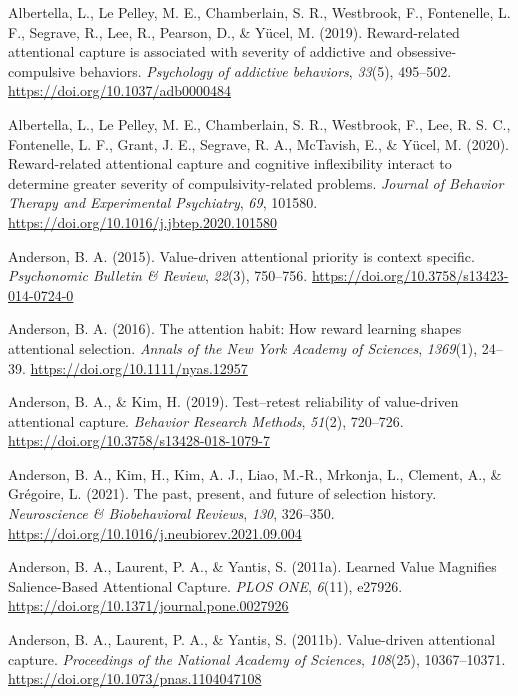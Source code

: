 \documentclass[
  man,
  floatsintext,
  longtable,
  nolmodern,
  notxfonts,
  notimes,
  mask,
  colorlinks=true,linkcolor=blue,citecolor=blue,urlcolor=blue]{apa7}
\newlength{\cslhangindent}
\newenvironment{CSLReferences}[2] %
 {\begin{list}{}{%
  \setlength{\itemindent}{0pt}
  \setlength{\leftmargin}{0pt}
  \setlength{\parsep}{0pt}
  \ifodd #1
   \setlength{\leftmargin}{\cslhangindent}
   \setlength{\itemindent}{-1\cslhangindent}
  \fi
  \setlength{\itemsep}{#2\baselineskip}}}
 {\end{list}}
\begin{document}
\label{refs}
\begin{CSLReferences}{1}{0}
Albertella, L., Le Pelley, M. E., Chamberlain, S. R., Westbrook, F.,
Fontenelle, L. F., Segrave, R., Lee, R., Pearson, D., \& Yücel, M.
(2019). Reward-related attentional capture is associated with severity
of addictive and obsessive-compulsive behaviors. \emph{Psychology of
addictive behaviors}, \emph{33}(5), 495--502.
\url{https://doi.org/10.1037/adb0000484}

Albertella, L., Le Pelley, M. E., Chamberlain, S. R., Westbrook, F.,
Lee, R. S. C., Fontenelle, L. F., Grant, J. E., Segrave, R. A.,
McTavish, E., \& Yücel, M. (2020). Reward-related attentional capture
and cognitive inflexibility interact to determine greater severity of
compulsivity-related problems. \emph{Journal of Behavior Therapy and
Experimental Psychiatry}, \emph{69}, 101580.
\url{https://doi.org/10.1016/j.jbtep.2020.101580}

Anderson, B. A. (2015). Value-driven attentional priority is context
specific. \emph{Psychonomic Bulletin \& Review}, \emph{22}(3), 750--756.
\url{https://doi.org/10.3758/s13423-014-0724-0}

Anderson, B. A. (2016). The attention habit: How reward learning shapes
attentional selection. \emph{Annals of the New York Academy of
Sciences}, \emph{1369}(1), 24--39.
\url{https://doi.org/10.1111/nyas.12957}

Anderson, B. A., \& Kim, H. (2019). Test--retest reliability of
value-driven attentional capture. \emph{Behavior Research Methods},
\emph{51}(2), 720--726. \url{https://doi.org/10.3758/s13428-018-1079-7}

Anderson, B. A., Kim, H., Kim, A. J., Liao, M.-R., Mrkonja, L., Clement,
A., \& Grégoire, L. (2021). The past, present, and future of selection
history. \emph{Neuroscience \& Biobehavioral Reviews}, \emph{130},
326--350. \url{https://doi.org/10.1016/j.neubiorev.2021.09.004}

Anderson, B. A., Laurent, P. A., \& Yantis, S. (2011a). Learned {Value
Magnifies Salience-Based Attentional Capture}. \emph{PLOS ONE},
\emph{6}(11), e27926. \url{https://doi.org/10.1371/journal.pone.0027926}

Anderson, B. A., Laurent, P. A., \& Yantis, S. (2011b). Value-driven
attentional capture. \emph{Proceedings of the National Academy of
Sciences}, \emph{108}(25), 10367--10371.
\url{https://doi.org/10.1073/pnas.1104047108}


\end{CSLReferences}
\end{document}

